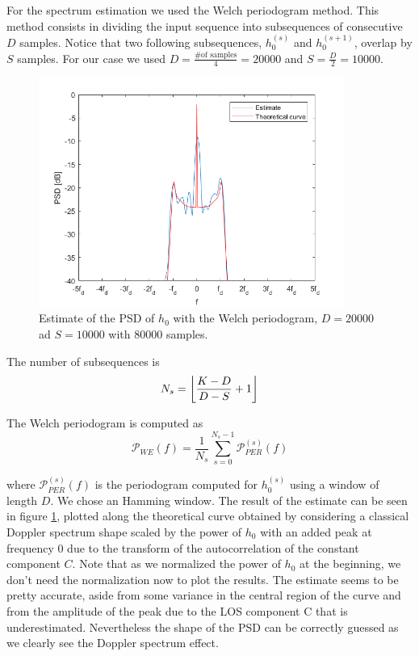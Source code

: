 \documentclass[a4paper,11.5pt]{article}
\DeclarePairedDelimiter{\floor}{\lfloor}{\rfloor}
\begin{document}
For the spectrum estimation we used the Welch periodogram method. This method consists in dividing the input sequence into subsequences of consecutive $D$ samples. Notice that two following subsequences, $h_0^{(s)}$ and $h_0^{(s+1)}$, overlap by $S$ samples. For our case we used $D =\frac{ \mbox{\# of samples}}{ 4}=20000$ and $S = \frac{D}{2}=10000$. \\


\begin{figure}[ht]
	\begin{center}    
		\includegraphics[width=10cm]{figs/PSD-est.png}
		\caption{Estimate of the PSD of $h_0$ with the Welch periodogram, $D=20000$ ad $S=10000$ with $80000$ samples.}
		\label{fig:PSD}
	\end{center}
\end{figure}
The number of subsequences is
\begin{equation}
N_s = \floor*{{\frac{K-D}{D-S}+1}}
\end{equation}

The Welch periodogram is computed as
\begin{equation}
\mathcal{P}_{WE}(f) = \frac{1}{N_s}\sum_{s=0}^{N_s-1}{\mathcal{P}}_{PER}^{(s)}(f)
\end{equation}

where ${\mathcal{P}}_{PER}^{(s)}(f)$ is the periodogram computed for $h_0^{(s)}$ using a window of length $D$. We chose an Hamming window. The result of the estimate can be seen in figure \ref{fig:PSD}, plotted along the theoretical curve obtained by considering a classical Doppler spectrum shape scaled by the power of $h_0$ with an added peak at frequency 0 due to the transform of the autocorrelation of the constant component $C$. Note that as we normalized the power of $h_0$ at the beginning, we don't need the normalization now to plot the results. The estimate seems to be pretty accurate, aside from some variance in the central region of the curve and from the amplitude of the peak due to the LOS component C that is underestimated. Nevertheless the shape of the PSD can be correctly guessed as we clearly see the Doppler spectrum effect.
\end{document}
